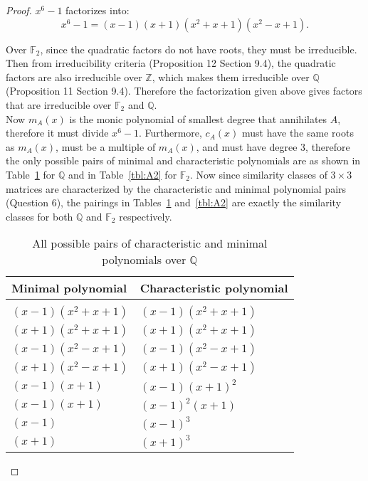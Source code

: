 \documentclass{article}
\begin{document}
  \begin{proof}
    $x^6-1$ factorizes into:
    \[x^6-1=(x-1)(x+1)(x^2+x+1)(x^2-x+1).\]

    Over $\mathbb{F}_2$, since the quadratic factors do not have roots,
    they must be irreducible. Then from irreducibility criteria
    (Proposition 12 Section 9.4), the quadratic factors are also
    irreducible over $\mathbb{Z}$, which makes them irreducible over
    $\mathbb{Q}$ (Proposition 11 Section 9.4). Therefore the factorization
    given above gives factors that are irreducible over $\mathbb{F}_2$ and
    $\mathbb{Q}$. \\

    Now $m_A(x)$ is the monic polynomial of smallest degree that
    annihilates $A$, therefore it must divide $x^6-1$. Furthermore,
    $c_A(x)$ must have the same roots as $m_A(x)$, must be a multiple of
    $m_A(x)$, and must have degree 3, therefore the only possible pairs of
    minimal and characteristic polynomials are as shown in
    Table~\ref{tbl:A1} for $\mathbb{Q}$ and in Table~\ref{tbl:A2} for
    $\mathbb{F}_2$. Now since similarity classes of $3\times3$ matrices are
    characterized by the characteristic and minimal polynomial pairs
    (Question 6), the pairings in Tables~\ref{tbl:A1} and~\ref{tbl:A2} are
    exactly the similarity classes for both $\mathbb{Q}$ and $\mathbb{F}_2$
    respectively. \\

    \begin{table}[h]
    \centering
    \begin{tabular}{ll}
      Minimal polynomial &Characteristic polynomial\\\hline\\
      $(x-1)(x^2+x+1)$ &$(x-1)(x^2+x+1)$\\
      $(x+1)(x^2+x+1)$ &$(x+1)(x^2+x+1)$\\
      $(x-1)(x^2-x+1)$ &$(x-1)(x^2-x+1)$\\
      $(x+1)(x^2-x+1)$ &$(x+1)(x^2-x+1)$\\
      $(x-1)(x+1)$ &$(x-1)(x+1)^2$\\
      $(x-1)(x+1)$ &$(x-1)^2(x+1)$\\
      $(x-1)$ &$(x-1)^3$\\
      $(x+1)$ &$(x+1)^3$\\
    \end{tabular}
    \caption{All possible pairs of characteristic and minimal polynomials
      over $\mathbb{Q}$}
    \label{tbl:A1}
    \end{table}


\end{proof}
\end{document}
